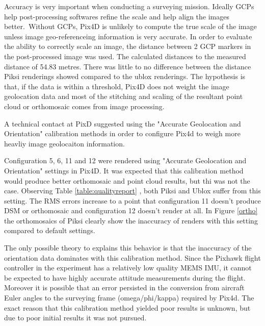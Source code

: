 \documentclass{article}
\begin{document}
Accuracy is very important when conducting a surveying mission. Ideally GCPs help post-processing 
softwares refine the scale and help align the images better. Without GCPs, Pix4D is unlikely to 
compute the true scale of the image unless image geo-referenceing information is very accurate. In 
order to evaluate the ability to correctly scale an image, the distance between 2 GCP markers in 
the post-processed image was used.  The calculated distances to the measured distance of 54.83 
metres. There was little to no difference between the distance Piksi renderings showed compared to 
the ublox renderings. The hypothesis is that, if the data is within a threshold, Pix4D does not 
weight the image geolocation data and most of the stitching and scaling of the resultant point 
cloud or orthomosaic comes from image processing.

A technical contact at PixD suggested using the "Accurate Geolocation and Orientation" calibration 
methods in order to configure Pix4d to weigh more heavliy image geolocaiton information.

Configuration 5, 6, 11 and 12 were rendered using "Accurate Geolocation and Orientation" settings 
in Pix4D.  It was expected that this calibration method would produce better orthomosaic and point 
cloud results, but thi was not the case. Observing Table \ref{table:qualityreport} , both Piksi and 
Ublox suffer from this setting. The RMS errors increase to a point that configuration 11 doesn't 
produce DSM or orthomosaic and configuration 12 doesn't render at all. In Figure \ref{ortho} the 
orthomosaics of Piksi clearly show the inaccuracy of renders with this setting compared to default 
settings.

The only possible theory to explains this behavior is that the inaccuracy of the orientation data 
dominates with this calibration method. Since the Pixhawk flight controller in the experiment has a 
relatively low quality MEMS IMU, it cannot be expected to have highly accurate attitude 
measurements during the flight.  Moreover it is possible that an error persisted in the conversion 
from aircraft Euler angles to the surveying frame (omega/phi/kappa) required by Pix4d.  The exact 
reason that this calibration method yielded poor results is unknown, but due to poor initial 
results it was not pursued.
\end{document}
